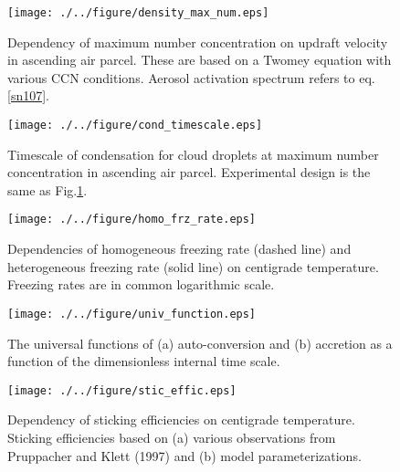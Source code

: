 \begin{figure}[htbp]
\begin{center}
\texttt{[image: ./../figure/density\_max\_num.eps]}
\end{center}
\caption{Dependency of maximum number concentration on updraft velocity in ascending air parcel. These are based on a Twomey equation with various CCN conditions. Aerosol activation spectrum refers to eq.\ref{sn107}.}
\label{figsn2-18}
\end{figure}

\begin{figure}[htbp]
\begin{center}
\texttt{[image: ./../figure/cond\_timescale.eps]}
\end{center}
\caption{Timescale of condensation for cloud droplets at maximum number concentration in ascending air parcel. Experimental design is the same as Fig.\ref{figsn2-18}.}
\label{figsn2-19}
\end{figure}

\begin{figure}[htbp]
\begin{center}
\texttt{[image: ./../figure/homo\_frz\_rate.eps]}
\end{center}
\caption{Dependencies of homogeneous freezing rate (dashed line) and heterogeneous freezing rate (solid line) on centigrade temperature. Freezing rates are in common logarithmic scale.}
\label{figsn2-20}
\end{figure}

\begin{figure}[htbp]
\begin{center}
\texttt{[image: ./../figure/univ\_function.eps]}
\end{center}
\caption{The universal functions of (a) auto-conversion and (b) accretion as a function of the dimensionless internal time scale.}
\label{figsn2-21}
\end{figure}

\begin{figure}[htbp]
\begin{center}
\texttt{[image: ./../figure/stic\_effic.eps]}
\end{center}
\caption{Dependency of sticking efficiencies on centigrade temperature. Sticking efficiencies based on (a) various observations from Pruppacher and Klett (1997) and (b) model parameterizations.}
\label{figsn2-22}
\end{figure}

